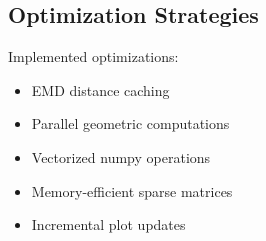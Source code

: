 \documentclass[11pt]{article}
\begin{document}
\subsection{Optimization Strategies}
Implemented optimizations:
\begin{itemize}
    \item EMD distance caching
    \item Parallel geometric computations
    \item Vectorized numpy operations
    \item Memory-efficient sparse matrices
    \item Incremental plot updates
\end{itemize}
\end{document}
